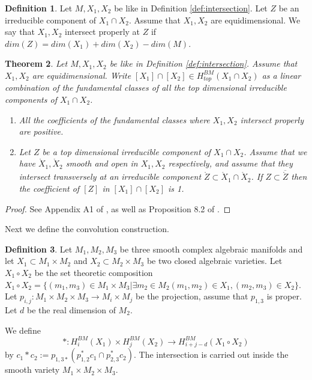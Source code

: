 \documentclass[12pt]{article}
\theoremstyle{plain}
\newtheorem{theorem}{Theorem}[section]
\theoremstyle{definition}
\newtheorem{defn}[theorem]{Definition}
\begin{document}
\begin{defn}
    Let $M,X_1,X_2$ be like in Definition \ref{def:intersection}. Let $Z$ be an irreducible component of $X_1\cap X_2$. Assume that $X_1,X_2$ are equidimensional. We say that $X_1,X_2$ intersect properly at $Z$  if $dim(Z)=dim(X_1)+dim(X_2)-dim(M)$. 
\end{defn}

\begin{theorem}\label{positive coef}
    Let $M,X_1,X_2$ be like in Definition \ref{def:intersection}. Assume that $X_1,X_2$ are equidimensional. Write $[X_1]\cap [X_2]\in H^{BM}_{top}(X_1\cap X_2)$ as a linear combination of the fundamental classes of all the top dimensional irreducible components of $X_1\cap X_2$. 
    
    \begin{enumerate}
        \item All the coefficients of the fundamental classes where $X_1,X_2$ intersect properly are positive. 
    \item  Let $Z$ be a top dimensional irreducible component of $X_1\cap X_2$. Assume that we have $\mathring{X}_1,\mathring{X}_2$ smooth and open in $X_1,X_2$ respectively, and assume that they intersect transversely at an irreducible component $\mathring{Z}\subset \mathring{X}_1\cap \mathring{X}_2$. If $Z\subset \overline{\mathring{Z}}$ then the coefficient of $[Z]$ in $[X_1]\cap [X_2]$ is 1.
    
    \end{enumerate}
    
    
\end{theorem}
\begin{proof}
    See Appendix A1 of \cite{MR2179652}, as well as Proposition 8.2 of \cite{FultonIntersectionTheory}.
\end{proof}


Next we define the convolution construction.

\begin{defn}
    Let $M_1,M_2,M_3$ be three smooth complex algebraic manifolds and let $X_1\subset M_1\times M_2$ and $X_2\subset M_2\times M_3$ be two closed algebraic varieties. Let $X_1\circ X_2$ be the set theoretic composition $X_1\circ X_2=\{(m_1,m_3)\in M_1\times M_3|\exists m_2\in M_2 (m_1,m_2)\in X_1, (m_2,m_3)\in X_2\}$. Let $p_{i,j}:M_1\times M_2\times M_3\rightarrow M_i\times M_j$ be the projection, assume that $p_{1,3}$ is proper. Let $d$ be the real dimension of $M_2$.

    We define $$*:H_i^{BM}(X_1)\times H_j^{BM}(X_2)\rightarrow H_{i+j-d}^{BM}(X_1\circ X_2)$$ by $c_1*c_2:=p_{1,3*}(p^*_{1,2}c_1\cap p^*_{2,3}c_2)$. The intersection is carried out inside the smooth variety $M_1\times M_2\times M_3$.
\end{defn}
\end{document}
